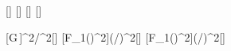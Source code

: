 [\kg]
[\m]
[\m]
[\m]

[G\,]{\ncGX*\mKuX^2/\rAX^2}[\N]
[F_1\left(\right)^2]{\FAX*(\rAX/\rBX)^2}[\N]
[F_1\left(\right)^2]{\FAX*(\rAX/\rCX)^2}[\N]
